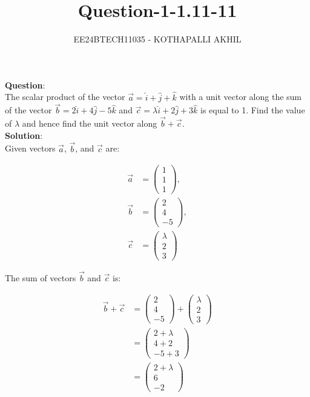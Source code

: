 \documentclass[journal]{IEEEtran}
\numberwithin{equation}{enumi}
\numberwithin{figure}{enumi}
\begin{document}

\title{Question-1-1.11-11}
\author{EE24BTECH11035 - KOTHAPALLI AKHIL}
{\let\newpage\relax\maketitle}
\textbf{Question}:\\
The scalar product of the vector $\vec{a}=\hat{i}+\hat{j}+\hat{k}$ with a unit vector along the sum of the vector $\vec{b}=2\hat{i}+4\hat{j}-5\hat{k}$ and $\vec{c}=\lambda\hat{i}+2\hat{j}+3\hat{k}$ is equal to 1. Find the  value of $\lambda$ and hence find the  unit vector along $\Vec{b}+\Vec{c}$.\\
\textbf{Solution}:\\
Given vectors $\vec{a}$, $\vec{b}$, and $\vec{c}$ are:

\begin{align}
\vec{a} &= \begin{pmatrix} 1 \\ 1 \\ 1 \end{pmatrix}, \\
\vec{b} &= \begin{pmatrix} 2 \\ 4 \\ -5 \end{pmatrix}, \\
\vec{c} &= \begin{pmatrix} \lambda \\ 2 \\ 3 \end{pmatrix}
\end{align}

The sum of vectors $\vec{b}$ and $\vec{c}$ is:

\begin{align}
\vec{b} + \vec{c} &= \begin{pmatrix} 2 \\ 4 \\ -5 \end{pmatrix} + \begin{pmatrix} \lambda \\ 2 \\ 3 \end{pmatrix} \\
&= \begin{pmatrix} 2 + \lambda \\ 4 + 2 \\ -5 + 3 \end{pmatrix} \\
&= \begin{pmatrix} 2 + \lambda \\ 6 \\ -2 \end{pmatrix}
\end{align}
\end{document}
